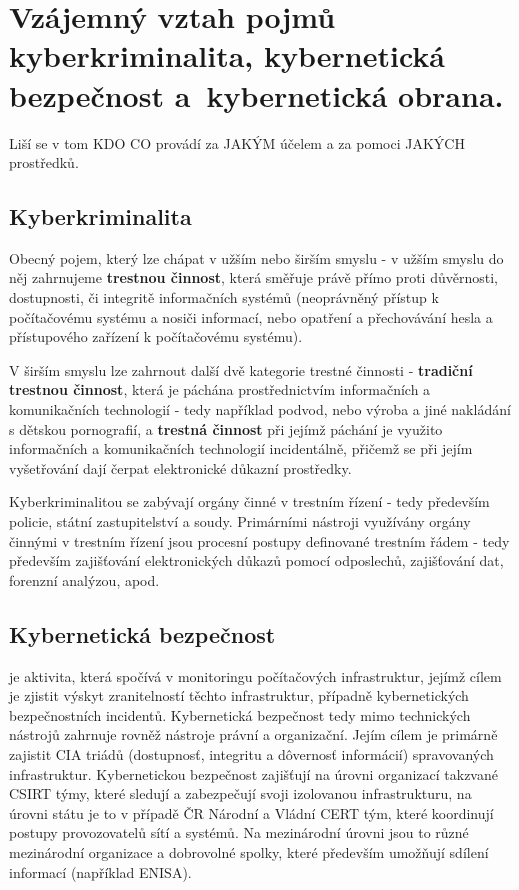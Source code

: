 \section{Vzájemný vztah pojmů kyberkriminalita, kybernetická bezpečnost a~kybernetická obrana.}
Liší se v tom KDO CO provádí za JAKÝM účelem a za pomoci JAKÝCH prostředků.

\subsection{Kyberkriminalita}
Obecný pojem, který lze chápat v užším nebo širším smyslu - v užším smyslu do něj zahrnujeme \textbf{trestnou činnost}, která směřuje právě přímo proti důvěrnosti, dostupnosti, či integritě informačních systémů (neoprávněný přístup k počítačovému systému a nosiči informací, nebo opatření a přechovávání hesla a přístupového zařízení k počítačovému systému). 

V širším smyslu lze zahrnout další dvě kategorie trestné činnosti - \textbf{tradiční trestnou činnost}, která je páchána prostřednictvím informačních a komunikačních technologií - tedy například podvod, nebo výroba a jiné nakládání s dětskou pornografií, a \textbf{trestná činnost} při jejímž páchání je využito informačních a komunikačních technologií incidentálně, přičemž se při jejím vyšetřování dají čerpat elektronické důkazní prostředky.

Kyberkriminalitou se zabývají orgány činné v trestním řízení - tedy především policie, státní zastupitelství a soudy.  Primárními nástroji využívány orgány činnými v trestním řízení jsou procesní postupy definované trestním řádem - tedy především zajišťování elektronických důkazů pomocí odposlechů, zajišťování dat, forenzní analýzou, apod.

\subsection{Kybernetická bezpečnost}
 je aktivita, která spočívá v monitoringu počítačových infrastruktur, jejímž cílem je zjistit výskyt zranitelností těchto infrastruktur, případně kybernetických bezpečnostních incidentů. Kybernetická bezpečnost tedy mimo technických nástrojů zahrnuje rovněž nástroje právní a organizační. Jejím cílem je primárně zajistit CIA triádů (dostupnosť, integritu a dôvernosť informácií) spravovaných infrastruktur. Kybernetickou bezpečnost zajišťují na úrovni organizací takzvané CSIRT týmy, které sledují a zabezpečují svoji izolovanou infrastrukturu, na úrovni státu je to v případě ČR Národní a Vládní CERT tým, které koordinují postupy provozovatelů sítí a systémů. Na mezinárodní úrovni jsou to různé mezinárodní organizace a dobrovolné spolky, které především umožňují sdílení informací (například ENISA).
 
